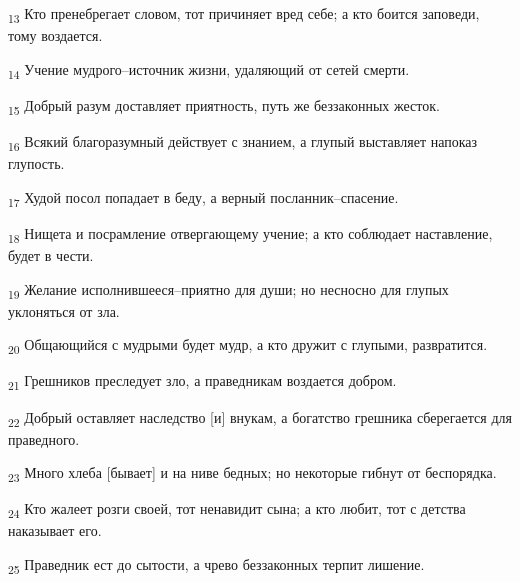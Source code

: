 \begin{tcolorbox}
\textsubscript{13} Кто пренебрегает словом, тот причиняет вред себе; а кто боится заповеди, тому воздается.
\end{tcolorbox}
\begin{tcolorbox}
\textsubscript{14} Учение мудрого--источник жизни, удаляющий от сетей смерти.
\end{tcolorbox}
\begin{tcolorbox}
\textsubscript{15} Добрый разум доставляет приятность, путь же беззаконных жесток.
\end{tcolorbox}
\begin{tcolorbox}
\textsubscript{16} Всякий благоразумный действует с знанием, а глупый выставляет напоказ глупость.
\end{tcolorbox}
\begin{tcolorbox}
\textsubscript{17} Худой посол попадает в беду, а верный посланник--спасение.
\end{tcolorbox}
\begin{tcolorbox}
\textsubscript{18} Нищета и посрамление отвергающему учение; а кто соблюдает наставление, будет в чести.
\end{tcolorbox}
\begin{tcolorbox}
\textsubscript{19} Желание исполнившееся--приятно для души; но несносно для глупых уклоняться от зла.
\end{tcolorbox}
\begin{tcolorbox}
\textsubscript{20} Общающийся с мудрыми будет мудр, а кто дружит с глупыми, развратится.
\end{tcolorbox}
\begin{tcolorbox}
\textsubscript{21} Грешников преследует зло, а праведникам воздается добром.
\end{tcolorbox}
\begin{tcolorbox}
\textsubscript{22} Добрый оставляет наследство [и] внукам, а богатство грешника сберегается для праведного.
\end{tcolorbox}
\begin{tcolorbox}
\textsubscript{23} Много хлеба [бывает] и на ниве бедных; но некоторые гибнут от беспорядка.
\end{tcolorbox}
\begin{tcolorbox}
\textsubscript{24} Кто жалеет розги своей, тот ненавидит сына; а кто любит, тот с детства наказывает его.
\end{tcolorbox}
\begin{tcolorbox}
\textsubscript{25} Праведник ест до сытости, а чрево беззаконных терпит лишение.
\end{tcolorbox}
